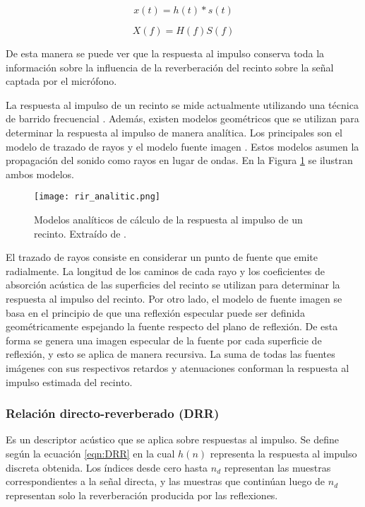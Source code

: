 \begin{equation}
\label{eqn:impulso}
	x(t) = h(t) * s(t)
\end{equation} 

\begin{equation}
\label{eqn:frecuencia}
	X(f) = H(f)S(f)
\end{equation} 

De esta manera se puede ver que la respuesta al impulso conserva toda la información sobre la influencia de la reverberación del recinto sobre la señal captada por el micrófono. 

La respuesta al impulso de un recinto se mide actualmente utilizando una técnica de barrido frecuencial \cite{sinesweep}. Además, existen modelos geométricos que se utilizan para determinar la respuesta al impulso de manera analítica. Los principales son el modelo de trazado de rayos \cite{raytracing} y el modelo fuente imagen \cite{sourceimage}. Estos modelos asumen la propagación del sonido como rayos en lugar de ondas. En la Figura \ref{fig:analitic_rir} se ilustran ambos modelos. 

\begin{figure}[H]
  \centering{}
  \texttt{[image: rir\_analitic.png]}
  \caption{Modelos analíticos de cálculo de la respuesta al impulso de un recinto. Extraído de \cite{rir}.}
  \label{fig:analitic_rir}
\end{figure} 

El trazado de rayos consiste en considerar un punto de fuente que emite radialmente. La longitud de los caminos de cada rayo y los coeficientes de absorción acústica de las superficies del recinto se utilizan para determinar la respuesta al impulso del recinto. Por otro lado, el modelo de fuente imagen se basa en el principio de que una reflexión especular puede ser definida geométricamente espejando la fuente respecto del plano de reflexión. De esta forma se genera una imagen especular de la fuente por cada superficie de reflexión, y esto se aplica de manera recursiva. La suma de todas las fuentes imágenes con sus respectivos retardos y atenuaciones conforman la respuesta al impulso estimada del recinto.



\subsubsection{Relación directo-reverberado (DRR)}

Es un descriptor acústico que se aplica sobre respuestas al impulso. Se define según la ecuación \ref{eqn:DRR} en la cual $h(n)$ representa la respuesta al impulso discreta obtenida. Los índices desde cero hasta $n_{d}$ representan las muestras correspondientes a la señal directa, y las muestras que continúan luego de $n_{d}$ representan solo la reverberación producida por las reflexiones. 

